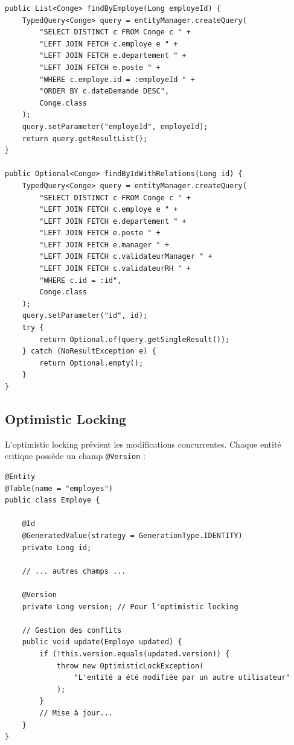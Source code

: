 \documentclass[12pt,a4paper,twoside]{report}
\begin{document}
\begin{lstlisting}[caption=Requête optimisée avec JOIN FETCH, label=lst:join-fetch]
public List<Conge> findByEmploye(Long employeId) {
    TypedQuery<Conge> query = entityManager.createQuery(
        "SELECT DISTINCT c FROM Conge c " +
        "LEFT JOIN FETCH c.employe e " +
        "LEFT JOIN FETCH e.departement " +
        "LEFT JOIN FETCH e.poste " +
        "WHERE c.employe.id = :employeId " +
        "ORDER BY c.dateDemande DESC", 
        Conge.class
    );
    query.setParameter("employeId", employeId);
    return query.getResultList();
}

public Optional<Conge> findByIdWithRelations(Long id) {
    TypedQuery<Conge> query = entityManager.createQuery(
        "SELECT DISTINCT c FROM Conge c " +
        "LEFT JOIN FETCH c.employe e " +
        "LEFT JOIN FETCH e.departement " +
        "LEFT JOIN FETCH e.poste " +
        "LEFT JOIN FETCH e.manager " +
        "LEFT JOIN FETCH c.validateurManager " +
        "LEFT JOIN FETCH c.validateurRH " +
        "WHERE c.id = :id", 
        Conge.class
    );
    query.setParameter("id", id);
    try {
        return Optional.of(query.getSingleResult());
    } catch (NoResultException e) {
        return Optional.empty();
    }
}
\end{lstlisting}

\subsection{Optimistic Locking}

L'optimistic locking prévient les modifications concurrentes. Chaque entité critique possède un champ \texttt{@Version} :

\begin{lstlisting}[caption=Entité avec optimistic locking, label=lst:optimistic-lock]
@Entity
@Table(name = "employes")
public class Employe {
    
    @Id
    @GeneratedValue(strategy = GenerationType.IDENTITY)
    private Long id;
    
    // ... autres champs ...
    
    @Version
    private Long version; // Pour l'optimistic locking
    
    // Gestion des conflits
    public void update(Employe updated) {
        if (!this.version.equals(updated.version)) {
            throw new OptimisticLockException(
                "L'entité a été modifiée par un autre utilisateur"
            );
        }
        // Mise à jour...
    }
}
\end{lstlisting}
\end{document}
